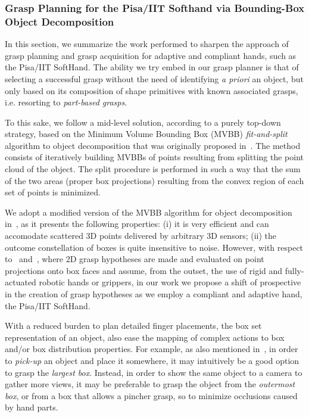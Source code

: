 
\subsubsection{Grasp Planning for the Pisa/IIT Softhand via Bounding-Box Object Decomposition}
\label{sec:GraspPlanningBoundingBoxes}

In this section, we summarize the work performed to sharpen the approach of grasp planning and grasp acquisition for adaptive and compliant hands, such as the Pisa/IIT SoftHand. The ability we try embed in our grasp planner is that of selecting a successful grasp without the need of identifying \emph{a priori} an object, but only based on its composition of shape primitives with known associated grasps, i.e. resorting to \emph{part-based grasps}.

To this sake, we follow a mid-level solution, according to a purely top-down strategy, based on the Minimum Volume Bounding Box (MVBB) \emph{fit-and-split} algorithm to object decomposition that was originally proposed in~\cite{Huebner:ICRA:2008}. The method consists of iteratively building MVBBs of points resulting from splitting the point cloud of the object. The split procedure is performed in such a way that the sum of the two areas (proper box projections) resulting from the convex region of each set of points is minimized.

We adopt a modified version of the MVBB algorithm for object decomposition in~\cite{Huebner:ICRA:2008}, as it presents the following properties: (i) it is very efficient and can accomodate scattered 3D points delivered by arbitrary 3D sensors; (ii) the outcome constellation of boxes is quite insensitive to noise. However, with respect to~\cite{Huebner:IROS:2008} and~\cite{Geidenstam:RSS:2009}, where 2D grasp hypotheses are made and evaluated on point projections onto box faces and assume, from the outset, the use of rigid and fully-actuated robotic hands or grippers, in our work we propose a shift of prospective in the creation of grasp hypotheses as we employ a compliant and adaptive hand, the Pisa/IIT SoftHand. 

With a reduced burden to plan detailed finger placements, the box set representation of an object, also ease the mapping of complex actions to box and/or box distribution properties. For example, as also mentioned in~\cite{Huebner:IROS:2008}, in order to \emph{pick-up} an object and place it somewhere, it may intuitively be a good option to grasp the \emph{largest box}. Instead, in order to show the same object to a camera to gather more views, it may be preferable to grasp the object from the \emph{outermost box}, or from a box that allows a pincher grasp, so to minimize occlusions caused by hand parts.

